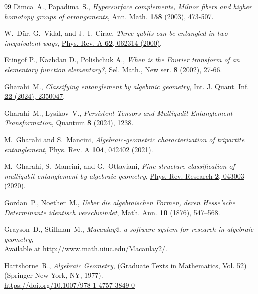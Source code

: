 \documentclass[aps,floatfix,groupedaddress,superscriptaddress,longbibliography,footinbib,notitlepage,showpacs]{revtex4-1}
\begin{document}
\begin{thebibliography}{99}
 {Dimca~A., Papadima~S.,
\textit{Hypersurface complements, Milnor fibers and higher homotopy groups of arrangements},
{\href{https://doi.org/10.4007/annals.2003.158.473}{Ann. Math. \textbf{158} (2003), 473-507}}.}

 {W.~D\"ur, G.~Vidal, and J.~I.~Cirac,
\textit{Three qubits can be entangled in two inequivalent ways},
{\href{https://doi.org/10.1103/PhysRevA.62.062314}{Phys. Rev. A \textbf{62}, 062314 (2000)}}.}

 {Etingof P., Kazhdan D., Polishchuk A.,
\textit{When is the Fourier transform of an elementary function elementary?},
{\href{https://doi.org/10.1007/s00029-002-8101-7}{Sel. Math., New ser. \textbf{8} (2002), 27-66}}.}

 {Gharahi~M.,
\textit{Classifying entanglement by algebraic geometry},
{\href{https://doi.org/10.1142/S0219749923500478}{Int. J. Quant. Inf. \textbf{22} (2024), 2350047}}.}

 {Gharahi~M., Lysikov~V.,
\textit{Persistent Tensors and Multiqudit Entanglement Transformation},
{\href{https://doi.org/10.22331/q-2024-01-31-1238}{Quantum \textbf{8} (2024), 1238}}.}

 {M.~Gharahi and S.~Mancini,
\textit{Algebraic-geometric characterization of tripartite entanglement},
{\href{https://doi.org/10.1103/PhysRevA.104.042402}{Phys. Rev. A \textbf{104}, 042402 (2021)}}.}

 {M.~Gharahi, S.~Mancini, and G.~Ottaviani,
\textit{Fine-structure classification of multiqubit entanglement by algebraic geometry},
{\href{https://doi.org/10.1103/PhysRevResearch.2.043003}{Phys. Rev. Research \textbf{2}, 043003 (2020)}}.}

 {Gordan~P., Noether~M., 
\textit{Ueber die algebraischen Formen, deren Hesse'sche Determinante identisch verschwindet},
{\href{https://doi.org/10.1007/BF01442264}{Math. Ann. \textbf{10} (1876), 547–568}}.}

 {Grayson~D., Stillman~M.,
\textit{Macaulay2, a software system for research in algebraic geometry}, \\
Available at \href{http://www.math.uiuc.edu/Macaulay2/}{http://www.math.uiuc.edu/Macaulay2/}.}

 {Hartshorne~R.,
\textit{Algebraic Geometry}, (Graduate Texts
in Mathematics, Vol. 52) {(Springer New York, NY, 1977).}}\\
{\href{https://doi.org/10.1007/978-1-4757-3849-0}{https://doi.org/10.1007/978-1-4757-3849-0}}


\end{thebibliography}
\end{document}
